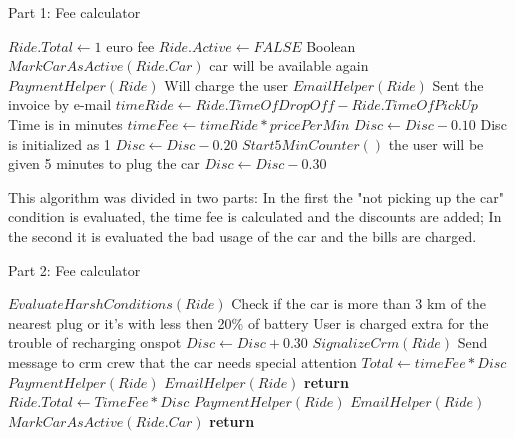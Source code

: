 \documentclass[a4paper]{article}
\begin{document}
\begin{algorithm}[H]
\caption{Part 1: Fee calculator}\label{Calc}
\begin{algorithmic}[1]

	\State $Ride.Total \leftarrow 1$  euro fee
	\State $Ride.Active \leftarrow FALSE$ \Comment Boolean
	\State $MarkCarAsActive(Ride.Car)$ \Comment car will be available again
	\State $PaymentHelper(Ride)$  \Comment Will charge the user
	\State $EmailHelper(Ride)$ \Comment Sent the invoice by e-mail 
\State
\Else
	\State $timeRide \leftarrow Ride.TimeOfDropOff - Ride.TimeOfPickUp$ \Comment Time is in minutes
	\State $timeFee \leftarrow timeRide * pricePerMin$
	\State
		\State $Disc \leftarrow Disc - 0.10$ \Comment Disc is initialized as 1
	\EndIf
	\State
		\State $Disc \leftarrow Disc - 0.20$
	\EndIf
	\State
		\State $Start5MinCounter()$ \Comment the user will be given 5 minutes to plug the car
			\State $Disc \leftarrow Disc - 0.30$
		\EndIf
	\EndIf
{}
\end{algorithmic}
\end{algorithm}
This algorithm was divided in two parts:  In the first the "not picking up the car" condition is evaluated, the time fee is calculated and the discounts are added; In the second it is evaluated the bad usage of the car and the bills are charged.
\begin{algorithm}[H]
\caption{Part 2: Fee calculator}
\begin{algorithmic}[1]
\State $EvaluateHarshConditions(Ride)$ \Comment Check if the car is more than 3 km of the nearest plug or it's with less then 20\% of battery 
	\State
	  \Comment User is charged extra for the trouble of recharging onspot 
		\State $Disc \leftarrow Disc + 0.30$ 
		\State $SignalizeCrm(Ride)$ \Comment Send message to crm crew that the car needs special attention
		\State $Total \leftarrow timeFee * Disc$  
		\State $PaymentHelper(Ride)$ 
		\State $EmailHelper(Ride)$ 
		\State \textbf{return}
	\EndIf
	\State
	\State $Ride.Total \leftarrow TimeFee * Disc$
	\State $PaymentHelper(Ride)$ 
	\State $EmailHelper(Ride)$
	\State $MarkCarAsActive(Ride.Car)$
	\State \textbf{return}
 \EndIf
\EndProcedure
\end{algorithmic}
\end{algorithm}
\end{document}
